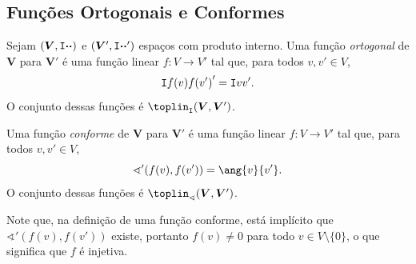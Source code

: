 \subsection{Funções Ortogonais e Conformes}

\begin{defi}
Sejam $(\bm V,\mathtt I{\bm{\cdot}}{\bm{\cdot}})$ e $(\bm V',\mathtt I{\bm{\cdot}}{\bm{\cdot}}')$ espaços com produto interno. Uma função \emph{ortogonal} de $\bm V$ para $\bm V'$ é uma função linear $f\colon V \to V'$ tal que, para todos $v,v' \in V$,
	\begin{equation*}
	\mathtt I{f(v)}{f(v')}' = \mathtt I{v}{v'}.
	\end{equation*}
O conjunto dessas funções é $\toplin_{\inte{}{}}(\bm V,\bm V')$.

Uma função \emph{conforme} de $\bm V$ para $\bm V'$ é uma função linear $f\colon V \to V'$ tal que, para todos $v,v' \in V$,
	\begin{equation*}
	\sphericalangle'(f(v),f(v')) = \ang{v}{v'}.
	\end{equation*}
O conjunto dessas funções é $\toplin_{\sphericalangle}(\bm V,\bm V')$.
\end{defi}

Note que, na definição de uma função conforme, está implícito que $\sphericalangle'(f(v),f(v'))$ existe, portanto $f(v) \neq 0$ para todo $v \in V \setminus \{0\}$, o que significa que $f$ é injetiva.

